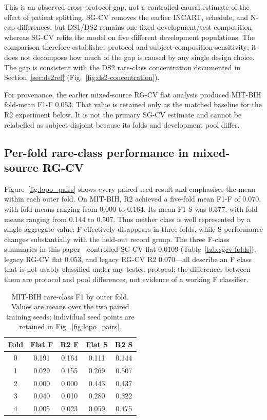 \documentclass[pdflatex,sn-mathphys-num]{sn-jnl}
\begin{document}
This is an observed cross-protocol gap, not a controlled causal estimate of the
effect of patient splitting. SG-CV removes the earlier INCART, schedule, and N-cap
differences, but DS1/DS2 remains one fixed development/test composition whereas
SG-CV refits the model on five different development populations. The comparison
therefore establishes protocol and subject-composition sensitivity; it does not
decompose how much of the gap is caused by any single design choice. The gap is
consistent with the DS2 rare-class concentration documented in
Section~\ref{sec:ds2ref} (Fig.~\ref{fig:ds2-concentration}).

For provenance, the earlier mixed-source RG-CV flat analysis produced MIT-BIH
fold-mean F1-F $0.053$. That value is retained only as the matched baseline for
the R2 experiment below. It is not the primary SG-CV estimate and cannot be
relabelled as subject-disjoint because its folds and development pool differ.

\subsection{Per-fold rare-class performance in mixed-source RG-CV}
Figure~\ref{fig:lopo_pairs} shows every paired seed result and emphasises the
mean within each outer fold. On MIT-BIH, R2 achieved a five-fold mean F1-F of
$0.070$, with fold means ranging from $0.000$ to $0.164$. Its mean F1-S was
$0.377$, with fold means ranging from $0.144$ to $0.507$. Thus neither class is
well represented by a single aggregate value: F effectively disappears in
three folds, while S performance changes substantially with the held-out record
group. The three F-class summaries in this paper---controlled SG-CV flat
$0.0109$ (Table~\ref{tab:sgcv-folds}), legacy RG-CV flat $0.053$, and legacy
RG-CV R2 $0.070$---all describe an F class that is not usably classified under
any tested protocol; the differences between them are protocol and pool
differences, not evidence of a working F classifier.

\begin{table}[htbp]
\caption{MIT-BIH rare-class F1 by outer fold. Values are means over the two
paired training seeds; individual seed points are retained in
Fig.~\ref{fig:lopo_pairs}.}
\label{tab:lopo-fold-f1}
\centering
\begin{tabular}{@{}ccccc@{}}
\toprule
Fold & Flat F & R2 F & Flat S & R2 S \\
\midrule
0 & 0.191 & 0.164 & 0.111 & 0.144 \\
1 & 0.029 & 0.155 & 0.269 & 0.507 \\
2 & 0.000 & 0.000 & 0.443 & 0.437 \\
3 & 0.040 & 0.010 & 0.280 & 0.322 \\
4 & 0.005 & 0.023 & 0.059 & 0.475 \\
\bottomrule
\end{tabular}
\end{table}
\end{document}
